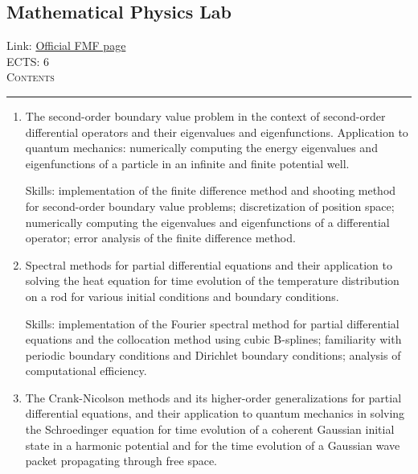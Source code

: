 \documentclass[11pt, a4paper]{article}
\newenvironment{course}[3]{
\subsection{#1}%
Link: \href{#2}{Official FMF page}\\%
ECTS: #3%
\vspace{1ex}
\\
{\large \textsc{Contents}}\\[-0.9ex]%
\rule{\textwidth}{0.5pt}
\vspace{-3ex}
}
{}
\newenvironment{chapter}[1]{
\begin{tcolorbox}[title=#1, breakable]
}
{\end{tcolorbox}}
\begin{document}
\begin{course}{Mathematical Physics Lab}{https://www.fmf.uni-lj.si/en/study-physics/programmes/1fiz/2020/7000777/courses/1159/}{6}
\begin{chapter}{Projects}
\begin{enumerate}
            Skills: numerical solutions of higher-order and vector-valued ordinary differential equations;
            implementation of symplectic integration methods (the 2nd-order Verlet method and the 4-th order position-extended Forest-Ruth method)
            implementation of standard numericla methods for ODEs (explicit Euler, Heun's method, the 2nd-order Runge-Kutta midpoint method, Ralston's 3rd-order RK3 method, 3rd-order strong, stability-preserving RK method, the classic and Ralston verssion of RK4, adaptive-step Runge-Kutta-Fehlberg and Cash-Karp methods, the 4th-order multistep predictor-corrector Adams-Bashforth-Moulton method)
            computation and plotting of phase spaces and vector fields
            numerical computation of elliptic integrals with arbitrary-precision libraries;
            analysis of solution accuracy and algorithmic efficiency.

            \item The second-order boundary value problem in the context of second-order differential operators and their eigenvalues and eigenfunctions.
            Application to quantum mechanics: numerically computing the energy eigenvalues and eigenfunctions of a particle in an infinite and finite potential well.

            Skills: implementation of the finite difference method and shooting method for second-order boundary value problems; discretization of position space; numerically computing the eigenvalues and eigenfunctions of a differential operator; error analysis of the finite difference method.

            \item Spectral methods for partial differential equations and their application to solving the heat equation for time evolution of the temperature distribution on a rod for various initial conditions and boundary conditions.

            Skills: implementation of the Fourier spectral method for partial differential equations and the collocation method using cubic B-splines;
            familiarity with periodic boundary conditions and Dirichlet boundary conditions;
            analysis of computational efficiency.

            \item The Crank-Nicolson methods and its higher-order generalizations for partial differential equations, and their application to quantum mechanics in solving the Schroedinger equation for time evolution of a coherent Gaussian initial state in a harmonic potential and for the time evolution of a Gaussian wave packet propagating through free space.


\end{enumerate}
\end{chapter}
\end{course}
\end{document}
